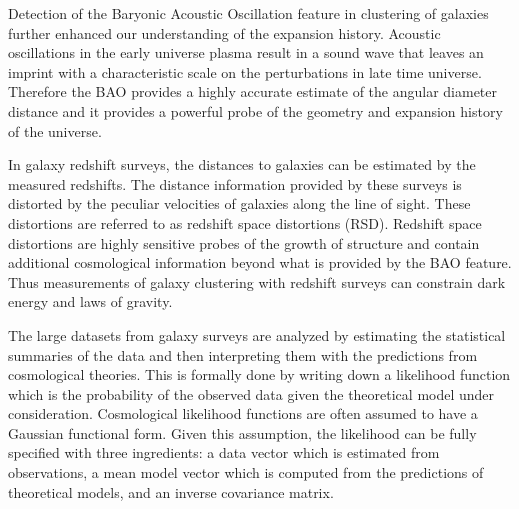 Detection of the Baryonic Acoustic Oscillation feature in clustering of galaxies 
further enhanced our understanding of the expansion history. 
Acoustic oscillations in the early universe plasma result in a sound wave 
that leaves an imprint with a characteristic scale on the perturbations 
in late time universe. Therefore the BAO provides a highly accurate estimate of the angular diameter 
distance and it provides a powerful probe of the geometry and expansion history of the universe. 

In galaxy redshift surveys, the distances to galaxies can be estimated by the measured 
redshifts. The distance information provided by these surveys is distorted by the peculiar 
velocities of galaxies along the line of sight. These distortions are referred to as redshift space 
distortions (RSD). Redshift space distortions are highly sensitive probes of the growth of structure 
and contain additional cosmological information beyond what is provided by the BAO feature. 
Thus measurements of galaxy clustering with redshift surveys can 
constrain dark energy and laws of gravity.



The large datasets from galaxy surveys are analyzed by estimating the statistical summaries of the 
data and then interpreting them with the predictions from cosmological theories. This is formally done 
by writing down a likelihood function which is the probability of the observed data given the theoretical model under 
consideration. Cosmological likelihood functions are often assumed to have a Gaussian 
functional form. Given this assumption, the likelihood can be fully specified with three ingredients: a data vector which is estimated from observations, a mean model vector 
which is computed from the predictions of theoretical models, and an inverse covariance matrix. 

